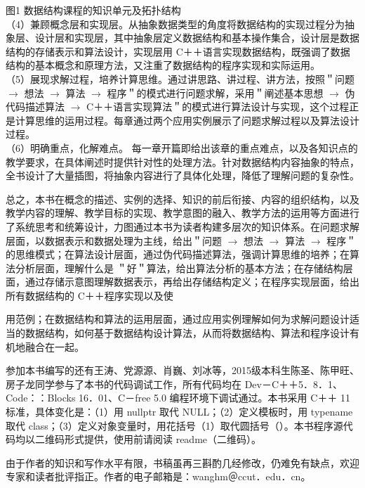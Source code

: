 \documentclass[10pt]{article}
\begin{document}
图1 数据结构课程的知识单元及拓扑结构\\
（4）兼顾概念层和实现层。从抽象数据类型的角度将数据结构的实现过程分为抽象层、设计层和实现层，其中抽象层定义数据结构和基本操作集合，设计层是数据结构的存储表示和算法设计，实现层用 C＋＋语言实现数据结构，既强调了数据结构的基本概念和原理方法，又注重了数据结构的程序实现和实际运用。\\
（5）展现求解过程，培养计算思维。通过讲思路、讲过程、讲方法，按照＂问题 $\rightarrow$ 想法 $\rightarrow$ 算法 $\rightarrow$ 程序＂的模式进行问题求解，采用＂阐述基本思想 $\rightarrow$ 伪代码描述算法 $\rightarrow$ C＋＋语言实现算法＂的模式进行算法设计与实现，这个过程正是计算思维的运用过程。每章通过两个应用实例展示了问题求解过程以及算法设计过程。\\
（6）明确重点，化解难点。 每一章开篇即给出该章的重点难点，以及各知识点的教学要求，在具体阐述时提供针对性的处理方法。针对数据结构内容抽象的特点，全书设计了大量插图，将抽象内容进行了具体化处理，降低了理解问题的复杂性。

总之，本书在概念的描述、实例的选择、知识的前后衔接、内容的组织结构，以及教学内容的理解、教学目标的实现、教学意图的融入、教学方法的运用等方面进行了系统思考和统筹设计，力图通过本书为读者构建多层次的知识体系。在问题求解层面，以数据表示和数据处理为主线，给出＂问题 $\rightarrow$ 想法 $\rightarrow$ 算法 $\rightarrow$ 程序＂的思维模式；在算法设计层面，通过伪代码描述算法，强调计算思维的培养；在算法分析层面，理解什么是 ＂好＂算法，给出算法分析的基本方法；在存储结构层面，通过存储示意图理解数据表示，再给出存储结构定义；在程序实现层面，给出所有数据结构的 C＋＋程序实现以及使

用范例；在数据结构和算法的运用层面，通过应用实例理解如何为求解问题设计适当的数据结构，如何基于数据结构设计算法，从而将数据结构、算法和程序设计有机地融合在一起。

参加本书编写的还有王涛、党源源、肖巍、刘冰等，2015级本科生陈圣、陈甲旺、房子龙同学参与了本书的代码调试工作，所有代码均在 Dev－C＋＋5．8．1、Code：：Blocks 16．01、C－free 5.0 编程环境下调试通过。本书采用 C＋＋ 11 标准，具体变化是：（1）用 nullptr 取代 NULL；（2）定义模板时，用 typename 取代 class；（3）定义对象变量时，用花括号（1）取代圆括号（）。本书程序源代码均以二维码形式提供，使用前请阅读 readme（二维码）。

由于作者的知识和写作水平有限，书稿虽再三斟酌几经修改，仍难免有缺点，欢迎专家和读者批评指正。作者的电子邮箱是：wanghm＠ccut．edu．cn。
\end{document}
